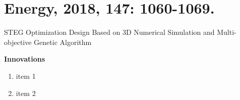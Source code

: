 \documentclass{beamer}
\begin{document}
\section{Energy, 2018, 147: 1060-1069.}

\begin{frame}{STEG Optimization Design Based on 3D Numerical Simulation and Multi-objective Genetic Algorithm}
    \begin{block}{\textbf{Innovations}}
        \begin{enumerate}
            \item item 1
            \item item 2
        \end{enumerate}   
    \end{block}
\end{frame}
\end{document}

